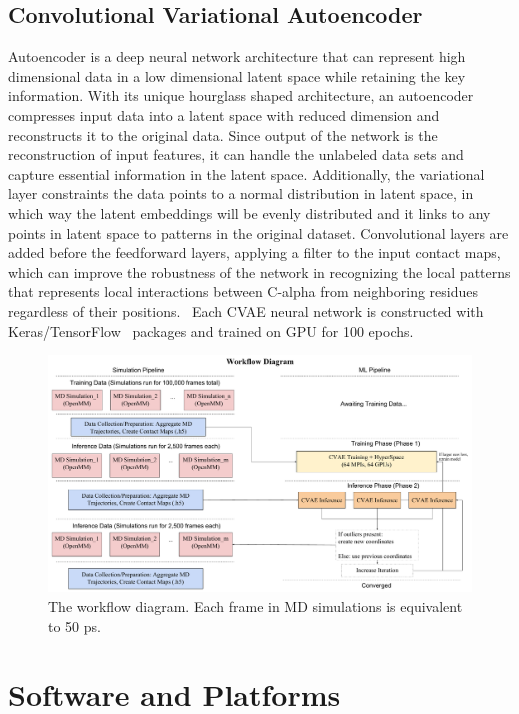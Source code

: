 \documentclass[conference,final]{IEEEtran}
\begin{document}
\subsection{Convolutional Variational Autoencoder}

Autoencoder is a deep neural network architecture that can represent high
dimensional data in a low dimensional latent space while retaining the key
information. With its unique hourglass shaped architecture, an autoencoder
compresses input data into a latent space with reduced dimension and
reconstructs it to the original data. Since output of the network is the
reconstruction of input features, it can handle the unlabeled data sets and
capture essential information in the latent space. Additionally, the
variational layer constraints the data points to a normal distribution in
latent space, in which way the latent embeddings will be evenly distributed
and it links to any points in latent space to patterns in the original
dataset. Convolutional layers are added before the feedforward layers,
applying a filter to the input contact maps, which can improve the robustness
of the network in recognizing the local patterns that represents local
interactions between C-alpha from neighboring residues regardless of their
positions.~\cite{bhowmik2018deep}  Each CVAE neural network is constructed with Keras/TensorFlow~\cite{chollet2015keras,abadi2016tensorflow}
packages and trained on GPU for 100 epochs.

\begin{figure}
	\centering
	\includegraphics[width=.8\textwidth]{MicroScope_Workflow_Diagram}
	\caption{The workflow diagram. Each frame in MD simulations is equivalent to 50 ps. }
	\label{fig:microscopeworkflowdiagram}
\end{figure}

\section{Software and Platforms}
\end{document}
